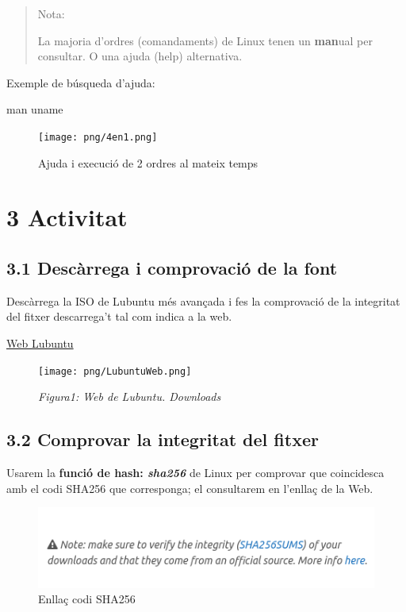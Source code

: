 \documentclass[
  12 pt,
  a4paper,
]{article}
\newenvironment{Shaded}{\begin{snugshade}}{\end{snugshade}}
\newcommand{\NormalTok}[1]{#1}
\begin{document}
\begin{quote}
Nota:

La majoria d'ordres (comandaments) de Linux tenen un \textbf{man}ual per
consultar. O una ajuda (help) alternativa.
\end{quote}

Exemple de búsqueda d'ajuda:

\begin{Shaded}
\begin{Highlighting}[]
\NormalTok{man uname}
\end{Highlighting}
\end{Shaded}

\begin{figure}
\centering
\texttt{[image: png/4en1.png]}
\caption{Ajuda i execució de 2 ordres al mateix temps}
\end{figure}

\section{3 Activitat}\label{activitat}

\subsection{3.1 Descàrrega i comprovació de la
font}\label{descuxe0rrega-i-comprovaciuxf3-de-la-font}

Descàrrega la ISO de Lubuntu més avançada i fes la comprovació de la
integritat del fitxer descarrega't tal com indica a la web.

\href{https://lubuntu.me/downloads/}{Web Lubuntu}

\begin{figure}
\centering
\texttt{[image: png/LubuntuWeb.png]}
\caption{\emph{Figura1: Web de Lubuntu. Downloads}}
\end{figure}

\subsection{3.2 Comprovar la integritat del
fitxer}\label{comprovar-la-integritat-del-fitxer}

Usarem la \textbf{funció de hash: \emph{sha256}} de Linux per comprovar
que coincidesca amb el codi SHA256 que corresponga; el consultarem en
l'enllaç de la Web.

\begin{figure}
\centering
\includegraphics{png/EnllaçSHA.png}
\caption{Enllaç codi SHA256}
\end{figure}
\end{document}
